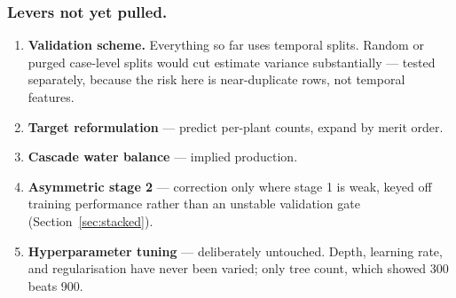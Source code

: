 \subsubsection*{Levers not yet pulled.}
\begin{enumerate}\itemsep1pt
  \item \textbf{Validation scheme.} Everything so far uses temporal splits. Random or purged
        case-level splits would cut estimate variance substantially --- tested separately, because
        the risk here is near-duplicate rows, not temporal features.
  \item \textbf{Target reformulation} --- predict per-plant counts, expand by merit order.
  \item \textbf{Cascade water balance} --- implied production.
  \item \textbf{Asymmetric stage 2} --- correction only where stage 1 is weak, keyed off training
        performance rather than an unstable validation gate (Section~\ref{sec:stacked}).
  \item \textbf{Hyperparameter tuning} --- deliberately untouched. Depth, learning rate, and
        regularisation have never been varied; only tree count, which showed 300 beats 900.
\end{enumerate}
